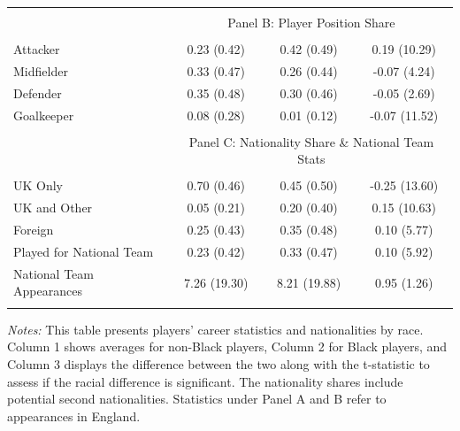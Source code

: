 \begin{table}[!ht]
{\begin{threeparttable}
\begin{tabular}{lccc}
\hline
\\[-1.8ex] 
& \multicolumn{3}{c}{Panel B: Player Position Share}\\
\hline
\\[-1.8ex] 
  Attacker & 0.23 (0.42) & 0.42 (0.49) & 0.19 (10.29) \\ 
  Midfielder & 0.33 (0.47) & 0.26 (0.44) & -0.07 (4.24) \\ 
  Defender & 0.35 (0.48) & 0.30 (0.46) & -0.05 (2.69) \\ 
  Goalkeeper & 0.08 (0.28) & 0.01 (0.12) & -0.07 (11.52) \\ 
\hline
\\[-1.8ex] 
& \multicolumn{3}{c}{Panel C: Nationality Share \& National Team Stats}\\
\hline
\\[-1.8ex] 
UK Only & 0.70 (0.46) & 0.45 (0.50) & -0.25 (13.60) \\ 
UK and Other & 0.05 (0.21) & 0.20 (0.40) & 0.15 (10.63) \\ 
Foreign & 0.25 (0.43) & 0.35 (0.48) & 0.10 (5.77) \\ 
Played for National Team & 0.23 (0.42) & 0.33 (0.47) & 0.10 (5.92) \\ 
National Team Appearances & 7.26 (19.30) & 8.21 (19.88) & 0.95 (1.26) \\ 
\hline
\\[-1.8ex] 

\end{tabular}
\begin{tablenotes}[flushleft]
		\item[] \scriptsize \textit{Notes:}
This table presents players' career statistics and nationalities by race. Column 1 shows averages for non-Black players, Column 2 for Black players, and Column 3 displays the difference between the two along with the t-statistic to assess if the racial difference is significant. The nationality shares include potential second nationalities. Statistics under Panel A and B refer to appearances in England.
		\end{tablenotes}
  \end{threeparttable}
  }
\end{table}
